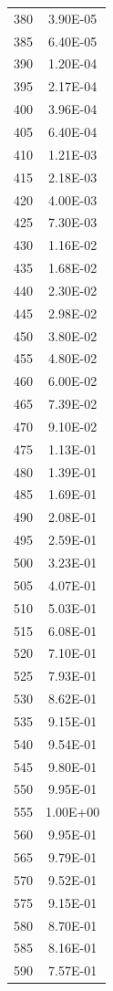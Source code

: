 \begin{table}[]
\twocolumn
\begin{supertabular}{cc}
380 & 3.90E-05 \\
385 & 6.40E-05 \\
390 & 1.20E-04 \\
395 & 2.17E-04 \\
400 & 3.96E-04 \\
405 & 6.40E-04 \\
410 & 1.21E-03 \\
415 & 2.18E-03 \\
420 & 4.00E-03 \\
425 & 7.30E-03 \\
430 & 1.16E-02 \\
435 & 1.68E-02 \\
440 & 2.30E-02 \\
445 & 2.98E-02 \\
450 & 3.80E-02 \\
455 & 4.80E-02 \\
460 & 6.00E-02 \\
465 & 7.39E-02 \\
470 & 9.10E-02 \\
475 & 1.13E-01 \\
480 & 1.39E-01 \\
485 & 1.69E-01 \\
490 & 2.08E-01 \\
495 & 2.59E-01 \\
500 & 3.23E-01 \\
505 & 4.07E-01 \\
510 & 5.03E-01 \\
515 & 6.08E-01 \\
520 & 7.10E-01 \\
525 & 7.93E-01 \\
530 & 8.62E-01 \\
535 & 9.15E-01 \\
540 & 9.54E-01 \\
545 & 9.80E-01 \\
550 & 9.95E-01 \\
555 & 1.00E+00 \\
560 & 9.95E-01 \\
565 & 9.79E-01 \\
570 & 9.52E-01 \\
575 & 9.15E-01 \\
580 & 8.70E-01 \\
585 & 8.16E-01 \\
590 & 7.57E-01 \\

\end{supertabular}
\end{table}
